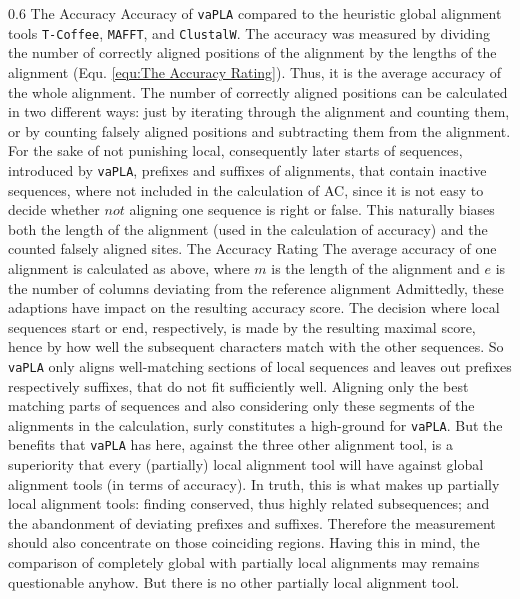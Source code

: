 \documentclass[a4paper,10pt]{thesis}
\newcommand{\software}{\texttt{vaPLA}}
\begin{document}
{{    
    {0.6\textwidth}
    {The Accuracy}
    {Accuracy of \software{} compared to the heuristic global alignment tools \texttt{T-Coffee}, \texttt{MAFFT}, and \texttt{ClustalW}.}%
    The accuracy was measured by dividing the number of correctly aligned positions of the alignment by the lengths of the alignment (Equ. \ref{equ:The Accuracy Rating}). Thus, it is the average accuracy of the whole alignment. The number of correctly aligned positions can be calculated in two different ways: just by iterating through the alignment and counting them, or by counting falsely aligned positions and subtracting them from the alignment. For the sake of not punishing local, consequently later starts of sequences, introduced by \software{}, prefixes and suffixes of alignments, that contain inactive sequences, where not included in the calculation of AC, since it is not easy to decide whether $not$ aligning one sequence is right or false. This naturally biases both the length of the alignment (used in the calculation of accuracy) and the counted falsely aligned sites.      
    {The Accuracy Rating}
    {The average accuracy of one alignment is calculated as above, where $m$ is the length of the alignment and $e$ is the number of columns deviating from the reference alignment}%
    Admittedly, these adaptions have impact on the resulting accuracy score. The decision where local sequences start or end, respectively, is made by the resulting maximal score, hence by how well the subsequent characters match with the other sequences. So \software{} only aligns well-matching sections of local sequences and leaves out prefixes respectively suffixes, that do not fit sufficiently well. Aligning only the best matching parts of sequences and also considering only these segments of the alignments in the calculation, surly constitutes a high-ground for \software{}.
    \gapSmall
    But the benefits that \software{} has here, against the three other alignment tool, is a superiority that every (partially) local alignment tool will have against global alignment tools (in terms of accuracy). In truth, this is what makes up partially local alignment tools: finding conserved, thus highly related subsequences; and the abandonment of deviating prefixes and suffixes. Therefore the measurement should also concentrate on those coinciding regions. 
    \gapSmall
    Having this in mind, the comparison of completely global with partially local alignments may remains questionable anyhow. But there is no other partially local alignment tool. 
}}
\end{document}
